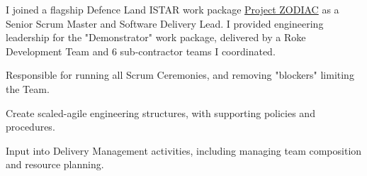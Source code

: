 {}
I joined a flagship Defence Land ISTAR work package \href{https://www.roke.co.uk/news/digitising-land-tactical-istar}{Project ZODIAC} as a Senior Scrum Master and Software Delivery Lead. I provided engineering leadership for the "Demonstrator" work package, delivered by a Roke Development Team and 6 sub-contractor teams I coordinated.
\vspace{0.25em}
\begin{tightemize}
  \item Responsible for running all Scrum Ceremonies, and removing "blockers" limiting the Team.
  \item Create scaled-agile engineering structures, with supporting policies and procedures.
  \item Input into Delivery Management activities, including managing team composition and resource planning.
\end{tightemize}
\sectionsep
